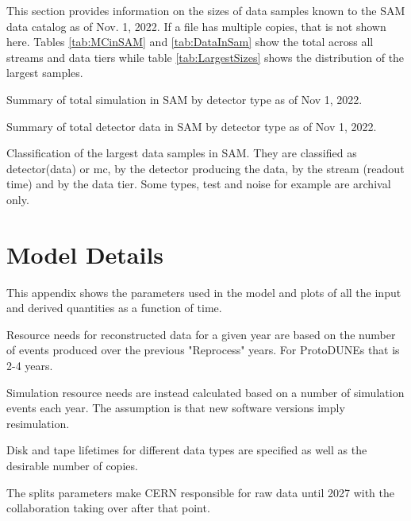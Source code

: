 \documentclass[12pt]{article}
\begin{document}
This section provides information on the sizes of data samples known to the SAM data catalog as of Nov. 1, 2022.  If a file has multiple copies, that is not shown here.  Tables \ref{tab:MCinSAM} and \ref{tab:DataInSam} show the total across all streams and data tiers while table \ref{tab:LargestSizes} shows the distribution of the largest samples.  


\begin{table}[ht]
 \centering{}
\caption{Summary  of total simulation in SAM by detector type as of Nov 1, 2022.} 
\label{tab:MCinSAM}
\end{table}

\begin{table}[ht]
 \centering{}
 \caption{Summary  of total detector data in SAM by detector type as of Nov 1, 2022.}
 \label{tab:DataInSam}
\end{table}



\begin{table}[ht]
 \centering{}
\caption{Classification of the largest data samples in SAM.  They are classified as detector(data) or mc, by the detector producing the data, by the stream (readout time) and by the data tier.  Some types, test and noise for example are archival only.  }
 \label{tab:LargestSizes}
\end{table}
\clearpage
\section{Model Details}

This appendix shows the parameters used in the model and plots of all the input and derived quantities as a function of time. 

Resource needs for reconstructed data for a given year are based on the number of events produced over the previous "Reprocess" years.   For ProtoDUNEs that is 2-4 years. 

Simulation resource needs are instead calculated based on a number of simulation events each year. The assumption is that new software versions imply resimulation.

Disk and tape lifetimes for different data types are specified as well as the desirable number of copies. 

The splits parameters make CERN responsible for raw data until 2027 with the collaboration taking over after that point. 


\end{document}
